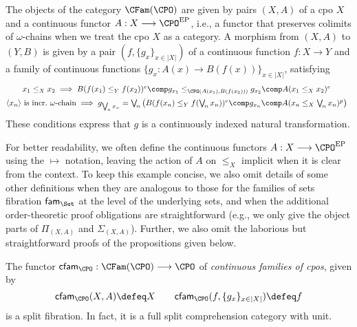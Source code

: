 \begin{definition}
\label{def:catofcontfamilies}
The objects of the category $\CFam(\CPO)$ are given by pairs $(X,A)$ of a cpo $X$ and a continuous functor $A : X \longrightarrow \CPO^{\text{EP}}$, i.e., a functor that preserves colimits of $\omega$-chains when we treat the cpo $X$ as a category. A morphism from $(X,A)$ to $(Y,B)$ is given by a pair $(f,\{g_x\}_{x \in \vert X \vert})$ of a continuous function $f : X \longrightarrow Y$ and a family of continuous functions $\{g_x : A(x) \longrightarrow B(f(x))\}_{x \in \vert X \vert}$, satisfying
\vspace{-0.15cm}
\[
\hspace{-0.175cm}
\begin{array}{c}
x_1 \leq_X x_2 \implies B(f(x_1) \leq_Y f(x_2))^e \comp g_{x_1} \leq _{\CPO(A(x_1),B(f(x_2)))} 
g_{x_2} \comp A(x_1 \leq_X x_2)^e
\\[2mm]
\langle x_n \rangle \text{~is incr.~} \omega \text{-chain} \implies g_{\bigvee_{\!n} x_n} = \bigvee_{\!n} \big(B(f(x_n) \leq_Y f(\bigvee_{\!n} x_n))^e \comp g_{x_n} \comp A(x_n \leq_X \bigvee_{\!n} x_n)^p\big)
\end{array}
\vspace{-0.1cm}
\]
These conditions express that $g$ is a continuously indexed natural transformation.
\end{definition}

For better readability, we often define the continuous functors $A : X \longrightarrow \CPO^{\text{EP}}$ using the $\mapsto$ notation, leaving the action of $A$ on $\leq_X$ implicit when it is clear from the context. To keep this example concise, we also omit details of some other definitions when they are analogous to those for the families of sets fibration $\mathsf{fam}_{\Set}$ at the level of the underlying sets, and when the additional order-theoretic proof obligations are straightforward (e.g., we only give the object parts of $\Pi_{(X,A)}$ and $\Sigma_{(X,A)}$). Further, we also omit the laborious but straightforward proofs of the propositions given below.

\begin{proposition}
\label{prop:continuousfamiliesfibration}
The functor $\mathsf{cfam}_{\CPO} : \CFam(\CPO) \longrightarrow \CPO$ of \emph{continuous families of cpos}, given by
\[
\mathsf{cfam}_{\CPO}(X,A) \defeq X
\qquad
\mathsf{cfam}_{\CPO}(f,\{g_x\}_{x \in \vert X \vert}) \defeq f
\]
is a split fibration. In fact, it is a full split comprehension category with unit.
\end{proposition}

